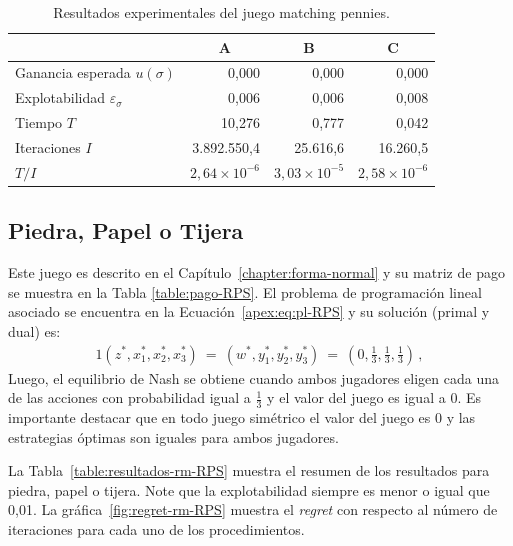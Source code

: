 \begin{table}[t]
\caption{Resultados experimentales del juego matching pennies.}
\label{table:resultados-rm-matching-pennies}
\centering
\begin{tabular}{l r r r}
    \toprule
    & \multicolumn{1}{c}{A} & \multicolumn{1}{c}{B} & \multicolumn{1}{c}{C} \\ \midrule
    Ganancia esperada $u(\sigma)$             &     0,000 &      0,000 &      0,000 \\
    Explotabilidad $\varepsilon_{\sigma}$     &         0,006 &      0,006 &      0,008 \\
    Tiempo $T$                                &        10,276 &      0,777 &      0,042 \\
    Iteraciones $I$                           & 3.892.550,4   & 25.616,6   & 16.260,5   \\
    $T/I$                                     & $2,64{\times}10^{-6}$ & $3,03{\times}10^{-5}$ & $2,58{\times}10^{-6}$ \\
    \bottomrule
\end{tabular}
\end{table}

\subsection*{Piedra, Papel o Tijera}

Este juego es descrito en el Capítulo~\ref{chapter:forma-normal} y su matriz de pago se muestra en la Tabla \ref{table:pago-RPS}. El problema de programación lineal asociado se encuentra en la Ecuación~\ref{apex:eq:pl-RPS} y su solución (primal y dual) es:
\begin{alignat}{1}
(z^*, x_1^*, x_2^*, x_3^*)\ =\ (w^*, y_1^*, y_2^*, y_3^*)\ =\  \left(0, \frac{1}{3}, \frac{1}{3}, \frac{1}{3}\right) \,,
\end{alignat}
Luego, el equilibrio de Nash se obtiene cuando ambos jugadores eligen cada una de las acciones con probabilidad igual a $\frac{1}{3}$ y el valor del juego es igual a $0$. Es importante destacar que en todo juego simétrico el valor del juego es $0$ y las estrategias óptimas son iguales para ambos jugadores.

La Tabla~\ref{table:resultados-rm-RPS} muestra el resumen de los resultados para piedra, papel o tijera. Note que la explotabilidad siempre es menor o igual que 0,01. La gráfica~\ref{fig:regret-rm-RPS} muestra el \textit{regret} con respecto al número de iteraciones para cada uno de los procedimientos.

